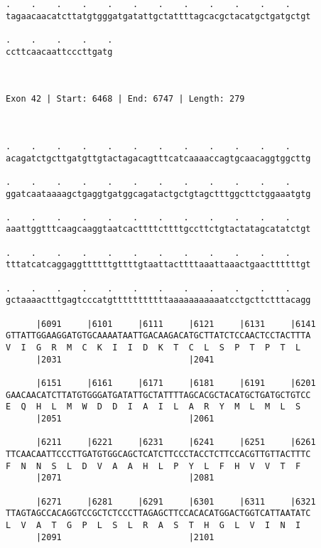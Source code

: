 \documentclass{article}
\begin{document}
\begin{Verbatim}
.    .    .    .    .    .    .    .    .    .    .    .    
tagaacaacatcttatgtgggatgatattgctattttagcacgctacatgctgatgctgt
                                                            
.    .    .    .    .
ccttcaacaattcccttgatg
                     
                     
 
Exon 42 | Start: 6468 | End: 6747 | Length: 279



.    .    .    .    .    .    .    .    .    .    .    .    
acagatctgcttgatgttgtactagacagtttcatcaaaaccagtgcaacaggtggcttg
                                                            
.    .    .    .    .    .    .    .    .    .    .    .    
ggatcaataaaagctgaggtgatggcagatactgctgtagctttggcttctggaaatgtg
                                                            
.    .    .    .    .    .    .    .    .    .    .    .    
aaattggtttcaagcaaggtaatcacttttcttttgccttctgtactatagcatatctgt
                                                            
.    .    .    .    .    .    .    .    .    .    .    .    
tttatcatcaggaggttttttgttttgtaattacttttaaattaaactgaacttttttgt
                                                            
.    .    .    .    .    .    .    .    .    .    .    .    
gctaaaactttgagtcccatgtttttttttttaaaaaaaaaaatcctgcttctttacagg
                                                            
      |6091     |6101     |6111     |6121     |6131     |6141
GTTATTGGAAGGATGTGCAAAATAATTGACAAGACATGCTTATCTCCAACTCCTACTTTA
V  I  G  R  M  C  K  I  I  D  K  T  C  L  S  P  T  P  T  L  
      |2031                         |2041                   
  
      |6151     |6161     |6171     |6181     |6191     |6201
GAACAACATCTTATGTGGGATGATATTGCTATTTTAGCACGCTACATGCTGATGCTGTCC
E  Q  H  L  M  W  D  D  I  A  I  L  A  R  Y  M  L  M  L  S  
      |2051                         |2061                   
  
      |6211     |6221     |6231     |6241     |6251     |6261
TTCAACAATTCCCTTGATGTGGCAGCTCATCTTCCCTACCTCTTCCACGTTGTTACTTTC
F  N  N  S  L  D  V  A  A  H  L  P  Y  L  F  H  V  V  T  F  
      |2071                         |2081                   
  
      |6271     |6281     |6291     |6301     |6311     |6321
TTAGTAGCCACAGGTCCGCTCTCCCTTAGAGCTTCCACACATGGACTGGTCATTAATATC
L  V  A  T  G  P  L  S  L  R  A  S  T  H  G  L  V  I  N  I  
      |2091                         |2101                   
  

\end{Verbatim}
\end{document}
